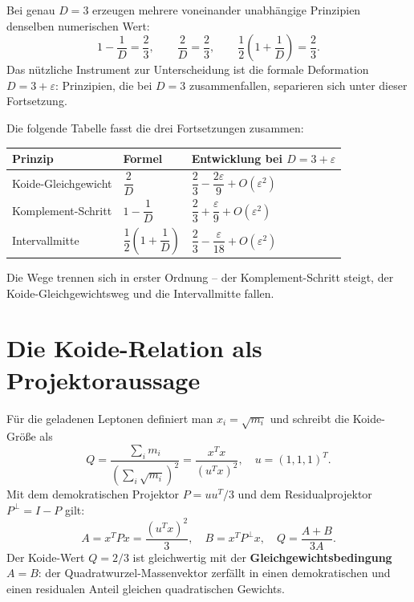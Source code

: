 Bei genau \(D = 3\) erzeugen mehrere voneinander unabhängige Prinzipien
denselben numerischen Wert:
\begin{equation}
  1 - \frac{1}{D} = \frac{2}{3}, \qquad
  \frac{2}{D} = \frac{2}{3}, \qquad
  \frac{1}{2}\!\left(1 + \frac{1}{D}\right) = \frac{2}{3}.
\end{equation}
Das nützliche Instrument zur Unterscheidung ist die formale Deformation
\(D = 3+\varepsilon\): Prinzipien, die bei \(D = 3\) zusammenfallen,
separieren sich unter dieser Fortsetzung.

Die folgende Tabelle fasst die drei Fortsetzungen zusammen:

\begin{center}
\renewcommand{\arraystretch}{1.5}
\begin{tabular}{lll}
\toprule
\textbf{Prinzip} & \textbf{Formel} & \textbf{Entwicklung bei \(D=3+\varepsilon\)} \\
\midrule
Koide-Gleichgewicht & \(\dfrac{2}{D}\)
  & \(\dfrac{2}{3} - \dfrac{2\varepsilon}{9} + O(\varepsilon^2)\) \\[6pt]
Komplement-Schritt & \(1 - \dfrac{1}{D}\)
  & \(\dfrac{2}{3} + \dfrac{\varepsilon}{9} + O(\varepsilon^2)\) \\[6pt]
Intervallmitte & \(\dfrac{1}{2}\!\left(1+\dfrac{1}{D}\right)\)
  & \(\dfrac{2}{3} - \dfrac{\varepsilon}{18} + O(\varepsilon^2)\) \\
\bottomrule
\end{tabular}
\end{center}

Die Wege trennen sich in erster Ordnung -- der Komplement-Schritt steigt,
der Koide-Gleichgewichtsweg und die Intervallmitte fallen.

\section{Die Koide-Relation als Projektoraussage}

Für die geladenen Leptonen definiert man \(x_i = \sqrt{m_i}\) und schreibt
die Koide-Größe als
\begin{equation}
  Q = \frac{\sum_i m_i}{\left(\sum_i \sqrt{m_i}\right)^2}
    = \frac{x^Tx}{(u^Tx)^2},
  \quad u = (1,1,1)^T.
\end{equation}
Mit dem demokratischen Projektor \(P = uu^T/3\) und dem Residualprojektor
\(P^\perp = I - P\) gilt:
\[
  A = x^TPx = \frac{(u^Tx)^2}{3}, \quad B = x^TP^\perp x,
  \quad Q = \frac{A+B}{3A}.
\]
Der Koide-Wert \(Q = 2/3\) ist gleichwertig mit der
\textbf{Gleichgewichtsbedingung} \(A = B\):
der Quadratwurzel-Massenvektor zerfällt in einen demokratischen
und einen residualen Anteil gleichen quadratischen Gewichts.

